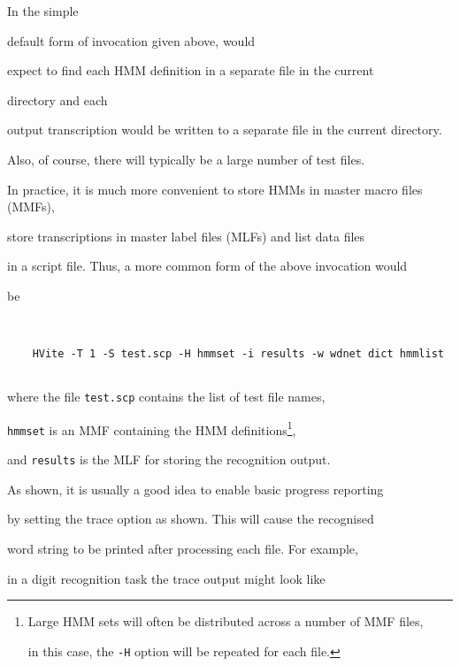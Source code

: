




In the simple


default form of invocation given above,  would


expect to find each HMM definition in a separate file in the current


directory and each


output transcription would be written to a separate file in the current directory.


Also, of course, there will typically be a large number of test files.





In practice, it is much more convenient to store HMMs in master macro files (MMFs),


store transcriptions in master label files (MLFs) and list data files


in a script file.  Thus, a more common form of the above invocation would


be 


\begin{verbatim}


    HVite -T 1 -S test.scp -H hmmset -i results -w wdnet dict hmmlist 


\end{verbatim}


where the file \texttt{test.scp} contains the list of test file names,


\texttt{hmmset} is an MMF containing the HMM definitions\footnote{


Large HMM sets will often be distributed across a number of MMF files,


in this case, the \texttt{-H} option will be repeated for each file.},


and  \texttt{results} is the MLF for storing the recognition output.







As shown, it is usually a good idea to enable basic progress reporting


by setting the trace option as shown.  This will cause the recognised


word string to be printed after processing each file.  For example,


in a digit recognition task the trace output might look like


